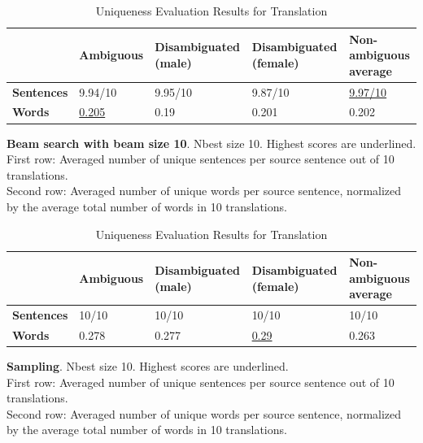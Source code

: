 \begin{table}[!htb]

    \begin{subtable}{\textwidth}
        \centering
        \begin{tabularx}{\linewidth}{|X|XXXX|}
            \hline
             & \textbf{Ambiguous} & \textbf{Disambiguated (male)} & \textbf{Disambiguated (female)} & \textbf{Non-ambiguous average} \\ \hline
             \textbf{Sentences} & 9.94/10 & 9.95/10 & 9.87/10 & \underline{9.97/10} \\ 
             \textbf{Words} & \underline{0.205} & 0.19 & 0.201 & 0.202 \\ \hline
        \end{tabularx}
        \caption{\textbf{Beam search with beam size 10}. Nbest size 10. Highest scores are underlined. \\ First row: Averaged number of unique sentences per source sentence out of 10 translations. \\ Second row: Averaged number of unique words per source sentence, normalized by the average total number of words in 10 translations.}
        \label{tab:uniqueness_translation_10}
    \end{subtable}

    \begin{subtable}{\textwidth}
        \centering
        \begin{tabularx}{\linewidth}{|X|XXXX|}
            \hline
             & \textbf{Ambiguous} & \textbf{Disambiguated (male)} & \textbf{Disambiguated (female)} & \textbf{Non-ambiguous average} \\ \hline
             \textbf{Sentences} & 10/10 & 10/10 & 10/10 & 10/10 \\ 
             \textbf{Words} & 0.278 & 0.277 & \underline{0.29} & 0.263 \\ \hline
        \end{tabularx}
        \caption{\textbf{Sampling}. Nbest size 10. Highest scores are underlined. \\ First row: Averaged number of unique sentences per source sentence out of 10 translations. \\ Second row: Averaged number of unique words per source sentence, normalized by the average total number of words in 10 translations.}
        \label{tab:uniqueness_translation_sampling}
    \end{subtable}
    \caption{Uniqueness Evaluation Results for Translation}
    \label{tab:uniqueness_translation}
\end{table}

